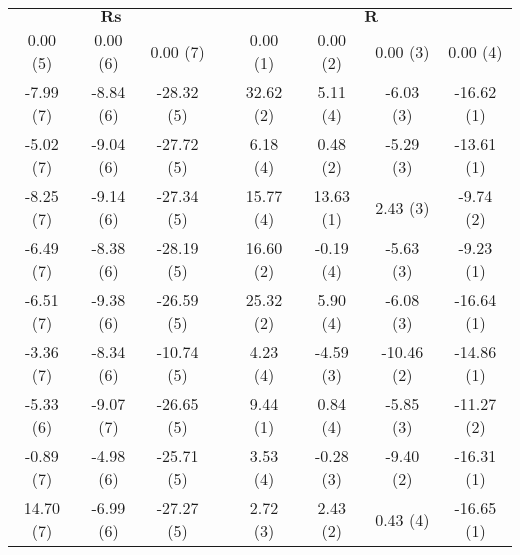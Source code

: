 \documentclass[11pt,a4paper,openright,twoside]{article}
\begin{document}
\begin{table}[h!]
\centering
\begin{tabular}{cccccccc}
\multicolumn{3}{c}{$\mathbf{Rs}$} & & \multicolumn{4}{c}{$\mathbf{R}$}\\
\cline{1-3} \cline{5-8}
0.00 (5) & 0.00 (6) & 0.00 (7) &  & 0.00 (1) & 0.00 (2) & 0.00 (3) & 0.00 (4)\\
-7.99 (7) & -8.84 (6) & -28.32 (5) &  & 32.62 (2) & 5.11 (4) & -6.03 (3) & -16.62 (1)\\
 -5.02 (7) & -9.04 (6) & -27.72 (5) &  & 6.18 (4) & 0.48 (2) & -5.29 (3) & -13.61 (1)\\
-8.25 (7) & -9.14 (6) & -27.34 (5) &  & 15.77 (4) & 13.63 (1) & 2.43 (3) & -9.74 (2)\\
-6.49 (7) & -8.38 (6) & -28.19 (5) &  & 16.60 (2) & -0.19 (4) & -5.63 (3) & -9.23 (1)\\
-6.51 (7) & -9.38 (6) & -26.59 (5) &  & 25.32 (2) & 5.90 (4) & -6.08 (3) & -16.64 (1)\\
-3.36 (7) & -8.34 (6) & -10.74 (5) &  & 4.23 (4) & -4.59 (3) & -10.46 (2) & -14.86 (1)\\
-5.33 (6) & -9.07 (7) & -26.65 (5) &  & 9.44 (1) & 0.84 (4) & -5.85 (3) & -11.27 (2)\\
-0.89 (7) & -4.98 (6) & -25.71 (5) &  & 3.53 (4) & -0.28 (3) & -9.40 (2) & -16.31 (1)\\
14.70 (7) & -6.99 (6) & -27.27 (5) &  & 2.72 (3) & 2.43 (2) & 0.43 (4) & -16.65 (1)\\
\end{tabular}
\end{table}
\end{document}
